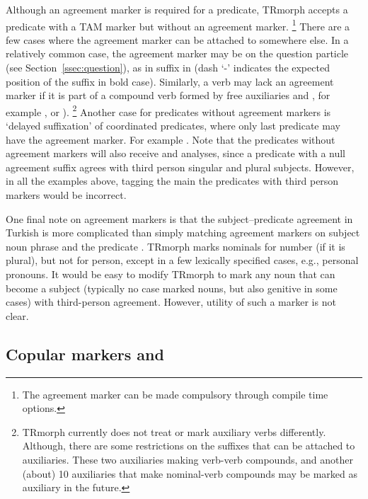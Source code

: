 \documentclass[twocolumn]{article}
\begin{document}
Although an agreement marker is required for a predicate,
TRmorph accepts a predicate with a TAM marker but without an agreement marker.%
\footnote{The agreement marker can be made compulsory through compile time options.}
There are a few cases where the agreement marker can be attached to somewhere else.
In a relatively common case, 
the agreement marker may be on the question particle 
(see Section~\ref{ssec:question}), as in 
 suffix  in 
(dash `-' indicates the expected position of the suffix in bold case).
Similarly, a verb may lack an agreement marker if it is part of a compound verb formed by free auxiliaries  and , 
for example ,
or ).%
\footnote{TRmorph currently does not treat or mark auxiliary verbs differently.
Although, there are some restrictions on the suffixes that can be attached to auxiliaries.
These two auxiliaries making verb-verb compounds, 
and another (about) 10 auxiliaries that make nominal-verb compounds may be marked as auxiliary in the future.}
Another case for predicates without agreement markers is `delayed suffixation' of coordinated predicates,
where only last predicate may have the agreement marker.
For example .
Note that the predicates without agreement markers will also receive  and  analyses,
since a predicate with a null agreement suffix agrees with third person singular and plural subjects.
However, in all the examples above, tagging the main the predicates with third person markers would be incorrect.

One final note on agreement markers is that 
the subject--predicate agreement in Turkish is more complicated than simply matching agreement markers on subject noun phrase and the predicate
\parencite[see][chapter~5]{goksel2005}.
TRmorph marks nominals for number (if it is plural), but not for person, 
except in a few lexically specified cases, e.g., personal pronouns.
It would be easy to modify TRmorph to mark any noun that can become a subject
(typically no case marked nouns, but also genitive in some cases)
with third-person agreement.
However, utility of such a marker is not clear.

\subsection{\label{ssec:verbal-copula}Copular markers and }
\end{document}
